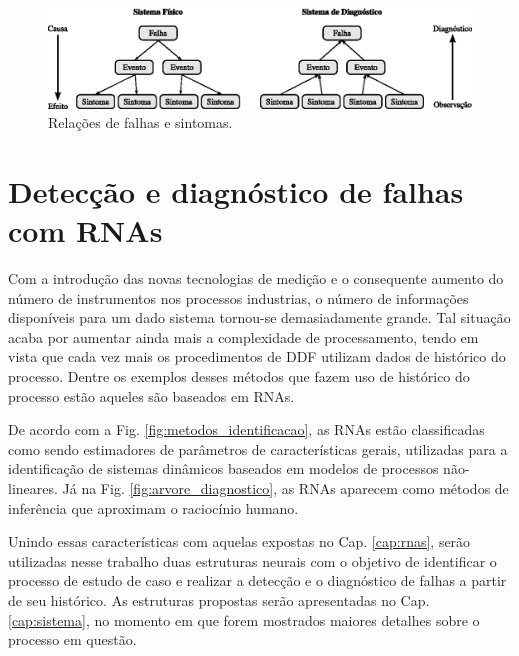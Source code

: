 \begin{figure}[htb]
\centering
    \includegraphics[width=\textwidth]{imgs/detec_diag/eps/falha_sintoma}
    \caption{Relações de falhas e sintomas.}
    \label{fig:falha_sintoma}
\end{figure}

\section{Detecção e diagnóstico de falhas com RNAs}
Com a introdução das novas tecnologias de medição e o consequente aumento do
número de instrumentos nos processos industrias, o número de informações
disponíveis para um dado sistema tornou-se demasiadamente grande. Tal situação
acaba por aumentar ainda mais a complexidade de processamento, tendo em vista
que cada vez mais os procedimentos de DDF utilizam dados de histórico do
processo. Dentre os exemplos desses métodos que fazem uso de histórico do
processo estão aqueles são baseados em RNAs.

De acordo com a Fig. \ref{fig:metodos_identificacao}, as RNAs estão
classificadas como sendo estimadores de parâmetros de características gerais,
utilizadas para a identificação de sistemas dinâmicos baseados em modelos de
processos não-lineares. Já na Fig. \ref{fig:arvore_diagnostico}, as RNAs
aparecem como métodos de inferência que aproximam o raciocínio humano.

Unindo essas características com aquelas expostas no Cap. \ref{cap:rnas}, serão
utilizadas nesse trabalho duas estruturas neurais com o objetivo de identificar
o processo de estudo de caso e realizar a detecção e o diagnóstico de falhas a
partir de seu histórico. As estruturas propostas serão apresentadas no Cap.
\ref{cap:sistema}, no momento em que forem mostrados maiores detalhes sobre o
processo em questão.
